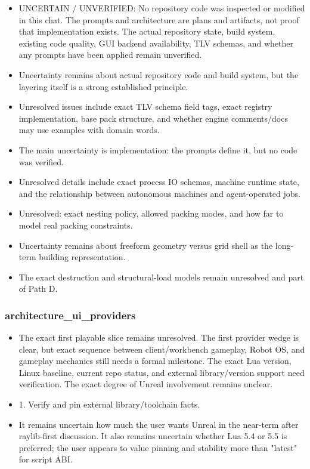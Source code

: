 \documentclass[11pt,a4paper]{report}
\begin{document}
\begin{itemize}
\item UNCERTAIN / UNVERIFIED: No repository code was inspected or modified in this chat. The prompts and architecture are plans and artifacts, not proof that implementation exists. The actual repository state, build system, existing code quality, GUI backend availability, TLV schemas, and whether any prompts have been applied remain unverified.
\item Uncertainty remains about actual repository code and build system, but the layering itself is a strong established principle.
\item Unresolved issues include exact TLV schema field tags, exact registry implementation, base pack structure, and whether engine comments/docs may use examples with domain words.
\item The main uncertainty is implementation: the prompts define it, but no code was verified.
\item Unresolved details include exact process IO schemas, machine runtime state, and the relationship between autonomous machines and agent-operated jobs.
\item Unresolved: exact nesting policy, allowed packing modes, and how far to model real packing constraints.
\item Uncertainty remains about freeform geometry versus grid shell as the long-term building representation.
\item The exact destruction and structural-load models remain unresolved and part of Path D.
\end{itemize}

\subsubsection{architecture\_ui\_providers}

\begin{itemize}
\item The exact first playable slice remains unresolved. The first provider wedge is clear, but exact sequence between client/workbench gameplay, Robot OS, and gameplay mechanics still needs a formal milestone. The exact Lua version, Linux baseline, current repo status, and external library/version support need verification. The exact degree of Unreal involvement remains unclear.
\item 1. Verify and pin external library/toolchain facts.
\item It remains uncertain how much the user wants Unreal in the near-term after raylib-first discussion. It also remains uncertain whether Lua 5.4 or 5.5 is preferred; the user appears to value pinning and stability more than "latest" for script ABI.
\end{itemize}
\end{document}

